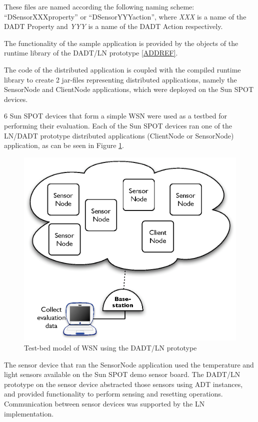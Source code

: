 These files are named according the following naming scheme:
``DSensorXXXproperty'' or ``DSensorYYYaction'', where \emph{XXX} is a name of the
DADT Property and \emph{YYY} is a name of the DADT Action respectively. 

The functionality of the sample application is provided by the objects
of the runtime library of the DADT/LN prototype \ref{ADDREF}.  

The code of the distributed application is coupled with the
compiled runtime library to create 2 jar-files representing distributed
applications, namely the SensorNode and ClientNode applications, which were
deployed on the Sun SPOT devices.

6 Sun SPOT devices that form a simple WSN were used as a testbed for performing
their evaluation. Each of the Sun SPOT devices ran one of the LN/DADT prototype
distributed applications (ClientNode or SensorNode) application, as can be seen
in Figure \ref{Fig:EvaluationConfig}.

\begin{figure}
\centering
\includegraphics[scale=0.50]{img/EvaluationConfig.eps} 
\caption[Test-bed model of WSN using the DADT/LN prototype]{Test-bed model of WSN using the DADT/LN prototype}
\label{Fig:EvaluationConfig}
\end{figure}

The sensor device that ran the SensorNode application used the temperature and
light sensors available on the Sun SPOT demo sensor board. The DADT/LN prototype
on the sensor device abstracted those sensors using ADT instances, and provided
functionality to perform sensing and resetting operations. Communication between
sensor devices was supported by the LN implementation.

